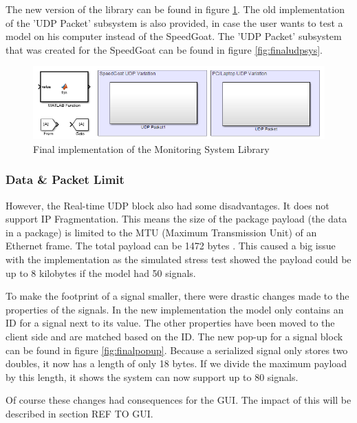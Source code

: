 The new version of the library can be found in figure \ref{fig:finalmonsys}. The old implementation of the 'UDP Packet' subsystem is also provided, in case the user wants to test a model on his computer instead of the SpeedGoat. The 'UDP Packet' subsystem that was created for the SpeedGoat can be found in figure \ref{fig:finaludpsys}.

\begin{figure}[H]
	\centering
	\includegraphics[width=.9\textwidth]{implementation/libraryfinal}
	\caption{Final implementation of the Monitoring System Library} 
	\label{fig:finalmonsys}
\end{figure}

\subsubsection{Data \& Packet Limit}
However, the Real-time UDP block also had some disadvantages. It does not support IP Fragmentation. This means the size of the package payload (the data in a package) is limited to the MTU (Maximum Transmission Unit) of an Ethernet frame. The total payload can be 1472 bytes \cite{web:RealTimeUdp}. This caused a big issue with the implementation as the simulated stress test showed the payload could be up to 8 kilobytes if the model had 50 signals.

To make the footprint of a signal smaller, there were drastic changes made to the properties of the signals. In the new implementation the model only contains an ID for a signal next to its value. The other properties have been moved to the client side and are matched based on the ID. The new pop-up for a signal block can be found in figure \ref{fig:finalpopup}. Because a serialized signal only stores two doubles, it now has a length of only 18 bytes. If we divide the maximum payload by this length, it shows the system can now support up to 80 signals.
   
Of course these changes had consequences for the GUI. The impact of this will be described in section REF TO GUI.


